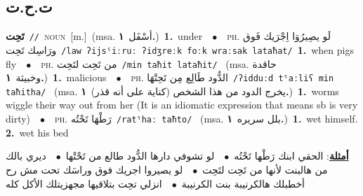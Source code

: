 \documentclass[10pt,a4paper,twoside]{article} %
\begin{document}
\begin{multicols}{2}
\vspace{-3mm}
\subsection*{\color{blue}\foreignlanguage{arabic}{ت.ح.ت}\color{blue}{}} 

{\setlength\topsep{0pt}\textbf{\foreignlanguage{arabic}{تَحِت}}\ {\color{gray}\texttt{//}\color{black}}\ \textsc{noun}\ [m.]\ \color{gray}(msa. \foreignlanguage{arabic}{أسْفَل}~\foreignlanguage{arabic}{\textbf{١.}})\color{black}\ \textbf{1.}~under\ \ $\bullet$\ \ \textsc{ph.} \color{gray} \foreignlanguage{arabic}{لَو يصِيرُوَا اِجْرَيك فَوق ورَاسِك تَحِت}\color{black}\ {\color{gray}\texttt{/{\sffamily law ʔijsˤiːruː ʔidʒreːk foːk wraːsak lataħat}/}\color{black}}\ \textbf{1.}~when pigs fly\ \ $\bullet$\ \ \textsc{ph.} \color{gray} \foreignlanguage{arabic}{من تَحِت لتَحِت}\color{black}\ {\color{gray}\texttt{/{\sffamily min taħit lataħit}/}\color{black}}\ \color{gray} (msa. \foreignlanguage{arabic}{حاقدة وخبيثة}~\foreignlanguage{arabic}{\textbf{١.}})\color{black}\ \textbf{1.}~malicious\ \ $\bullet$\ \ \textsc{ph.} \color{gray} \foreignlanguage{arabic}{الدُّود طَالِع مِن تَحِتْهَا}\color{black}\ {\color{gray}\texttt{/{\sffamily ʔidduːd tˤaːliʕ min taħitha}/}\color{black}}\ \color{gray} (msa. \foreignlanguage{arabic}{يخرج الدود من هذا الشخص (كناية على أنه قذر)}~\foreignlanguage{arabic}{\textbf{١.}})\color{black}\ \textbf{1.}~worms wiggle their way out from her (It is an idiomatic expression that means sb is very dirty)\ \ $\bullet$\ \ \textsc{ph.} \color{gray} \foreignlanguage{arabic}{رَطْهَا تَحْتُه}\color{black}\ {\color{gray}\texttt{/{\sffamily ratˤhaː taħto}/}\color{black}}\ \color{gray} (msa. \foreignlanguage{arabic}{بلل سريره}~\foreignlanguage{arabic}{\textbf{١.}})\color{black}\ \textbf{1.}~wet himself.  \textbf{2.}~wet his bed\  \begin{flushright}\color{gray}\foreignlanguage{arabic}{\textbf{\underline{\foreignlanguage{arabic}{أمثلة}}}: الحقي ابنك رَطْها تَحْتُه\ $\bullet$\ \  لو تشوفي دارها الدُّود طالع من تَحْتْها\ $\bullet$\ \  ديري بالك من هالبنت لأنها من تَحِت لتَحِت\ $\bullet$\ \  لو يصيروا اجريك فوق وراسَك تحت مش رح أخطبلك هالكرنيبة بنت الكرنيبة\ $\bullet$\ \  انزلي تحِت بتلاقيها مجهزيتلك الأكل كله}\end{flushright}\color{black}} \vspace{2mm}


\end{multicols}
\end{document}
